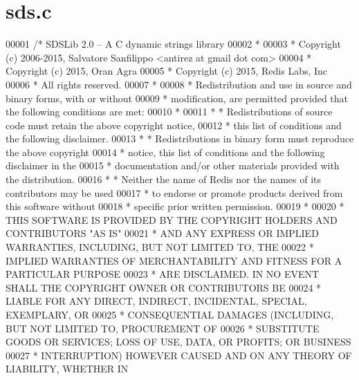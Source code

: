\hypertarget{sds_8c_source}{}\section{sds.\+c}
\label{sds_8c_source}

\begin{DoxyCode}
00001 \textcolor{comment}{/* SDSLib 2.0 -- A C dynamic strings library}
00002 \textcolor{comment}{ *}
00003 \textcolor{comment}{ * Copyright (c) 2006-2015, Salvatore Sanfilippo <antirez at gmail dot com>}
00004 \textcolor{comment}{ * Copyright (c) 2015, Oran Agra}
00005 \textcolor{comment}{ * Copyright (c) 2015, Redis Labs, Inc}
00006 \textcolor{comment}{ * All rights reserved.}
00007 \textcolor{comment}{ *}
00008 \textcolor{comment}{ * Redistribution and use in source and binary forms, with or without}
00009 \textcolor{comment}{ * modification, are permitted provided that the following conditions are met:}
00010 \textcolor{comment}{ *}
00011 \textcolor{comment}{ *   * Redistributions of source code must retain the above copyright notice,}
00012 \textcolor{comment}{ *     this list of conditions and the following disclaimer.}
00013 \textcolor{comment}{ *   * Redistributions in binary form must reproduce the above copyright}
00014 \textcolor{comment}{ *     notice, this list of conditions and the following disclaimer in the}
00015 \textcolor{comment}{ *     documentation and/or other materials provided with the distribution.}
00016 \textcolor{comment}{ *   * Neither the name of Redis nor the names of its contributors may be used}
00017 \textcolor{comment}{ *     to endorse or promote products derived from this software without}
00018 \textcolor{comment}{ *     specific prior written permission.}
00019 \textcolor{comment}{ *}
00020 \textcolor{comment}{ * THIS SOFTWARE IS PROVIDED BY THE COPYRIGHT HOLDERS AND CONTRIBUTORS "AS IS"}
00021 \textcolor{comment}{ * AND ANY EXPRESS OR IMPLIED WARRANTIES, INCLUDING, BUT NOT LIMITED TO, THE}
00022 \textcolor{comment}{ * IMPLIED WARRANTIES OF MERCHANTABILITY AND FITNESS FOR A PARTICULAR PURPOSE}
00023 \textcolor{comment}{ * ARE DISCLAIMED. IN NO EVENT SHALL THE COPYRIGHT OWNER OR CONTRIBUTORS BE}
00024 \textcolor{comment}{ * LIABLE FOR ANY DIRECT, INDIRECT, INCIDENTAL, SPECIAL, EXEMPLARY, OR}
00025 \textcolor{comment}{ * CONSEQUENTIAL DAMAGES (INCLUDING, BUT NOT LIMITED TO, PROCUREMENT OF}
00026 \textcolor{comment}{ * SUBSTITUTE GOODS OR SERVICES; LOSS OF USE, DATA, OR PROFITS; OR BUSINESS}
00027 \textcolor{comment}{ * INTERRUPTION) HOWEVER CAUSED AND ON ANY THEORY OF LIABILITY, WHETHER IN}

\end{DoxyCode}
